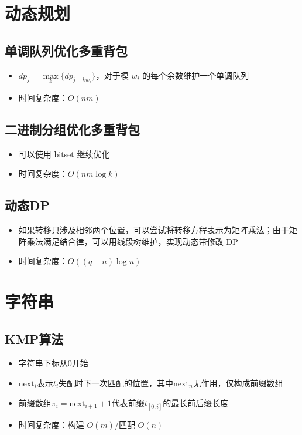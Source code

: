 \documentclass[twocolumn,a4,8pt]{article}  %
\begin{document}
	\section{动态规划}
	 	\subsection{单调队列优化多重背包}
	 		\noindent\begin{itemize}
		 		\item $dp_j=\underset{k}\max\{dp_{j-kw_i}\}$，对于模 $w_i$ 的每个余数维护一个单调队列
		 		\item 时间复杂度：$O(nm)$
	 		\end{itemize}
	 	 	
	 	 	
	 	\subsection{二进制分组优化多重背包}
	 		\noindent\begin{itemize}
		 		\item 可以使用 bitset 继续优化
		 		\item 时间复杂度：$O(nm\log k)$
	 		\end{itemize}
	 	 	
	 	 	
		\subsection{动态DP}
	 		\noindent\begin{itemize}
		 		\item 如果转移只涉及相邻两个位置，可以尝试将转移方程表示为矩阵乘法；由于矩阵乘法满足结合律，可以用线段树维护，实现动态带修改 DP
		 		\item 时间复杂度：$O((q+n)\log n)$
	 		\end{itemize}
	 	 	
	 	 	
	\section{字符串}
		\subsection{KMP算法}
	 		\noindent\begin{itemize}
		 		\item 字符串下标从0开始
		 		\item $\text{next}_i$表示$t_i$失配时下一次匹配的位置，其中$\text{next}_n$无作用，仅构成前缀数组
		 		\item 前缀数组$\pi_i=\text{next}_{i+1}+1$代表前缀$t_{[0,i]}$的最长前后缀长度
		 		\item 时间复杂度：构建 $O(m)$/匹配 $O(n)$
	 		\end{itemize}
	 	 	
	 	
\end{document}
